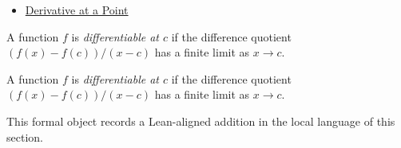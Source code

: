 \begin{dependencies}
\begin{itemize}
  \item \hyperref[def:derivative-at-a-point]{Derivative at a Point}
\end{itemize}
\end{dependencies}

\begin{definition}
\label{def:is-differentiable}
A function $f$ is \emph{differentiable at $c$} if the difference quotient $(f(x)-f(c))/(x-c)$ has a finite limit as $x\to c$.
\end{definition}

\begin{remark*}
A function $f$ is \emph{differentiable at $c$} if the difference quotient $(f(x)-f(c))/(x-c)$ has a finite limit as $x\to c$.
\end{remark*}

\begin{remark*}[Interpretation]
This formal object records a Lean-aligned addition in the local language of this section.
\end{remark*}

\begin{dependencies}
\NoLocalDependencies
\end{dependencies}
